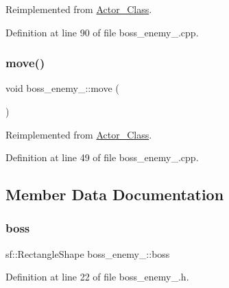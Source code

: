 Reimplemented from \hyperlink{class_actor___class_ab33216a3ce0c856bdc16231c71ae35c2}{Actor\+\_\+\+Class}.



Definition at line 90 of file boss\+\_\+enemy\+\_.\+cpp.

\hypertarget{classboss__enemy__2_a8d81c7498b4a31d735bd4af21ce81d84}{}\label{classboss__enemy__2_a8d81c7498b4a31d735bd4af21ce81d84} 
\subsubsection{\texorpdfstring{move()}{move()}}
{\footnotesize\ttfamily void boss\+\_\+enemy\+\_\+::move (\begin{DoxyParamCaption}{ }\end{DoxyParamCaption})\hspace{0.3cm}{\ttfamily [virtual]}}



Reimplemented from \hyperlink{class_actor___class_af1764a94c5410ba8476f56553cd2c327}{Actor\+\_\+\+Class}.



Definition at line 49 of file boss\+\_\+enemy\+\_.\+cpp.



\subsection{Member Data Documentation}
\hypertarget{classboss__enemy__2_a1ffee874c7083f8bcdb2b66bef56daa2}{}\label{classboss__enemy__2_a1ffee874c7083f8bcdb2b66bef56daa2} 
\subsubsection{\texorpdfstring{boss}{boss}}
{\footnotesize\ttfamily sf\+::\+Rectangle\+Shape boss\+\_\+enemy\+\_\+::boss}



Definition at line 22 of file boss\+\_\+enemy\+\_.\+h.

\hypertarget{classboss__enemy__2_a838ab901aab6f1e202d924dfc32dc420}{}\label{classboss__enemy__2_a838ab901aab6f1e202d924dfc32dc420} 
